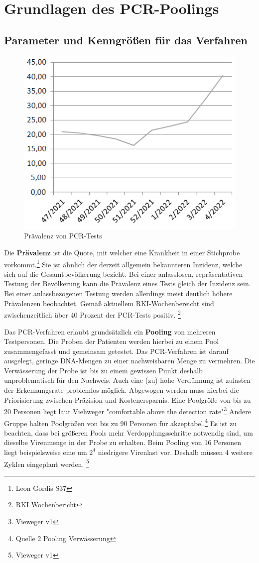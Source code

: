 \cleardoublepage
\chapter{Grundlagen des PCR-Poolings}
\section{Parameter und Kenngrößen für das Verfahren}
\begin{figure}
	\includegraphics[width=.44\textwidth]{img/RKI_PCR_Positivrate}
	\caption{Prävalenz von PCR-Tests}
\end{figure}
Die \textbf{Prävalenz} ist die Quote, mit welcher eine Krankheit in einer Stichprobe vorkommt.\footnote{Leon Gordis S37}
Sie ist ähnlich der derzeit allgemein bekannteren Inzidenz, welche sich auf die Gesamtbevölkerung bezieht.
Bei einer anlasslosen, repräsentativen Testung der Bevölkerung kann die Prävalenz eines Tests gleich der Inzidenz sein.
Bei einer anlassbezogenen Testung werden allerdings meist deutlich höhere Prävalenzen beobachtet.
Gemäß aktuellem RKI-Wochenbereicht sind zwischenzeitlich über 40 Prozent der PCR-Tests positiv.
\footnote{RKI Wochenbericht}

Das PCR-Verfahren erlaubt grundsätzlich ein \textbf{Pooling} von mehreren Testpersonen.
Die Proben der Patienten werden hierbei zu einem Pool zusammengefasst und gemeinsam getestet.
Das PCR-Verfahren ist darauf ausgelegt, geringe DNA-Mengen zu einer nachweisbaren Menge zu vermehren.
Die Verwässerung der Probe ist bis zu einem gewissen Punkt deshalb unproblematisch für den Nachweis.
Auch eine (zu) hohe Verdünnung ist zulasten der Erkennungsrate problemlos möglich.
Abgewogen werden muss hierbei die Priorisierung zwischen Präzision und Kostenersparnis.
Eine Poolgröße von bis zu 20 Personen liegt laut Viehweger "comfortable above the detection rate"\footnote{Vieweger v1}
Andere Gruppe halten Poolgrößen von bis zu 90 Personen für akzeptabel.\footnote{Quelle 2 Pooling Verwässerung}
Es ist zu beachten, dass bei größeren Pools mehr Verdopplungsschritte notwendig sind, um dieselbe Virenmenge in der Probe zu erhalten.
Beim Pooling von 16 Personen liegt beispielsweise eine um $2^{4}$ niedrigere Virenlast vor.
Deshalb müssen 4 weitere Zyklen eingeplant werden.
\footnote{Vieweger v1}

